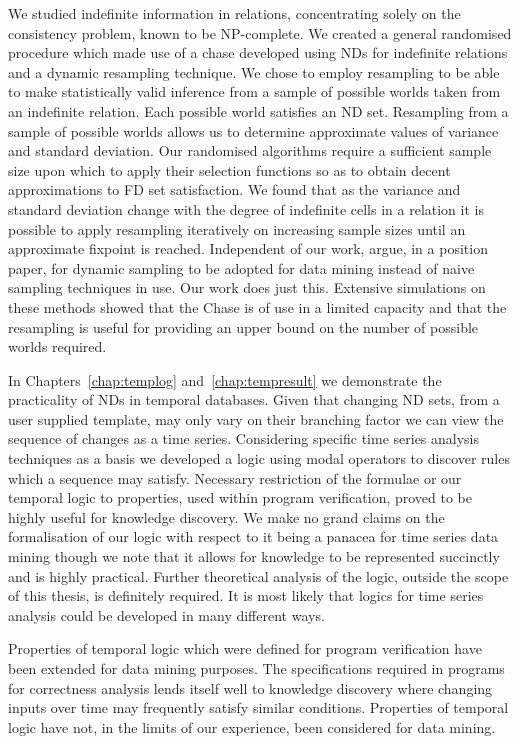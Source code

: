 We studied indefinite information in relations, concentrating solely
on the consistency problem, known to be NP-complete. We created a
general randomised procedure which made use of a chase developed using
NDs for indefinite relations and a dynamic resampling technique. We
chose to employ resampling to be able to make statistically valid
inference from a sample of possible worlds taken from an indefinite
relation. Each possible world satisfies an ND set. Resampling from a
sample of possible worlds allows us to determine approximate values of
variance and standard deviation. Our randomised algorithms require a
sufficient sample size upon which to apply their selection functions
so as to obtain decent approximations to FD set satisfaction. We found
that as the variance and standard deviation change with the degree of
indefinite cells in a relation it is possible to apply resampling
iteratively on increasing sample sizes until an approximate fixpoint
is reached. Independent of our work, \cite{jl96} argue, in a position
paper, for dynamic sampling to be adopted for data mining instead of
naive sampling techniques in use. Our work does just this. Extensive
simulations on these methods showed that the Chase is of use in
a limited capacity and that the resampling is useful for providing an
upper bound on the number of possible worlds required.

\medskip

In Chapters~\ref{chap:templog} and~\ref{chap:tempresult} we
demonstrate the practicality of NDs in temporal databases. Given that
changing ND sets, from a user supplied template, may only vary on
their branching factor we can view the sequence of changes as a time
series. Considering specific time series analysis techniques as a
basis we developed a logic using modal operators to discover rules
which a sequence may satisfy. Necessary restriction of the formulae or
our temporal logic to properties, used within program verification,
proved to be highly useful for knowledge discovery. We make no grand
claims on the formalisation of our logic with respect to it being a
panacea for time series data mining though we note that it allows for
knowledge to be represented succinctly and is highly
practical. Further theoretical analysis of the logic, outside the
scope of this thesis, is definitely required. It is most likely that
logics for time series analysis could be developed in many different
ways.

\medskip

Properties of temporal logic which were defined for program
verification have been extended for data mining purposes. The
specifications required in programs for correctness analysis lends
itself well to knowledge discovery where changing inputs over time may
frequently satisfy similar conditions. Properties of temporal logic
have not, in the limits of our experience, been considered for data
mining. 

